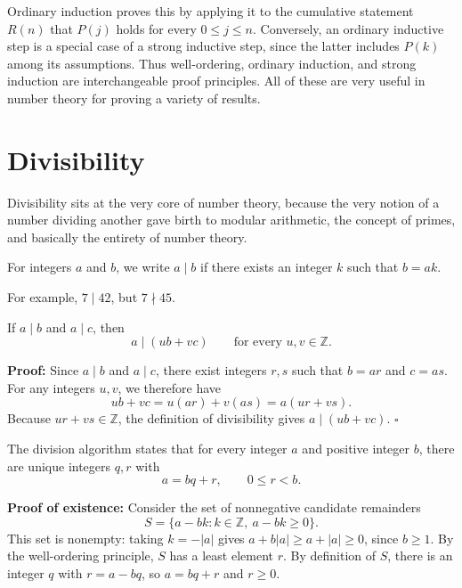 \documentclass[a4paper,11pt,abstracton]{scrartcl}
\theoremstyle{dotlessP}
\theoremstyle{dotlessS}
\theoremstyle{remark}
\theoremstyle{definition}
\begin{document}
Ordinary induction proves this by applying it to the cumulative statement
$R(n)$ that $P(j)$ holds for every $0\leq j\leq n$.
Conversely, an ordinary inductive step is a special case of a strong
inductive step, since the latter includes $P(k)$ among its assumptions.
Thus well-ordering, ordinary induction, and strong induction are
interchangeable proof principles. All of these are very useful in number theory for proving a variety of results.

\section{Divisibility}

Divisibility sits at the very core of number theory, because the very notion of a number dividing another gave birth to modular arithmetic, the concept of primes, and basically the entirety of number theory.

\begin{definition_box}
For integers $a$ and $b$, we write $a\mid b$ if there exists an integer
$k$ such that $b=ak$.
\end{definition_box}

\begin{example_box}
For example, $7\mid 42$, but $7\nmid 45$.
\end{example_box}

\begin{remark_box}
If $a\mid b$ and $a\mid c$, then
\[
    a\mid (ub+vc)\qquad\text{for every }u,v\in\mathbb{Z}.
\]
\end{remark_box}

\textbf{Proof:}
Since $a\mid b$ and $a\mid c$, there exist integers $r,s$ such that
$b=ar$ and $c=as$. For any integers $u,v$, we therefore have
\[
    ub+vc=u(ar)+v(as)=a(ur+vs).
\]
Because $ur+vs\in\mathbb{Z}$, the definition of divisibility gives
$a\mid(ub+vc)$.
\hfill$\square$


\begin{remark_box}
The division algorithm states that for every integer $a$ and positive
integer $b$, there are unique integers $q,r$ with
\[
    a=bq+r,\qquad 0\leq r<b.
\]
\end{remark_box}

\textbf{Proof of existence:}
Consider the set of nonnegative candidate remainders
\[
    S=\{a-bk : k\in\mathbb{Z},\ a-bk\geq0\}.
\]
This set is nonempty: taking $k=-|a|$ gives
$a+b|a|\geq a+|a|\geq0$, since $b\geq1$.
By the well-ordering principle, $S$ has a least element $r$.
By definition of $S$, there is an integer $q$ with $r=a-bq$, so
$a=bq+r$ and $r\geq0$.
\end{document}
